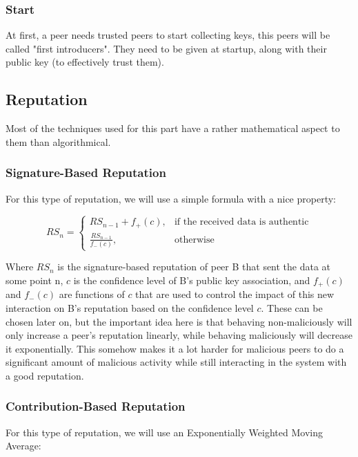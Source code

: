 \documentclass[]{article}
\begin{document}
\subsubsection{Start}
At first, a peer needs trusted peers to start collecting keys, this peers will be called "first introducers". They need to be given at startup, along with their public key (to effectively trust them).

\subsection{Reputation}
\label{sec:rep-spec}
Most of the techniques used for this part have a rather mathematical aspect to them than algorithmical.

\subsubsection{Signature-Based Reputation}
For this type of reputation, we will use a simple formula with a nice property:

\begin{equation}
    RS_n = 
    \begin{cases}
        RS_{n-1} + f_+(c),       & \text{if the received data is authentic}
        \\
        \frac{RS_{n-1}}{f_-(c)}, & \text{otherwise}
    \end{cases}
\end{equation}

Where $RS_n$ is the signature-based reputation of peer B that sent the data at some point n, $c$ is the confidence level of B's public key association, and $f_+(c)$ and $f_-(c)$ are functions of $c$ that are used to control the impact of this new interaction on B's reputation based on the confidence level $c$.
These can be chosen later on, but the important idea here is that behaving non-maliciously will only increase a peer's reputation linearly, while behaving maliciously will decrease it exponentially.
This somehow makes it a lot harder for malicious peers to do a significant amount of malicious activity while still interacting in the system with a good reputation.

\subsubsection{Contribution-Based Reputation}
For this type of reputation, we will use an Exponentially Weighted Moving Average:
\end{document}

